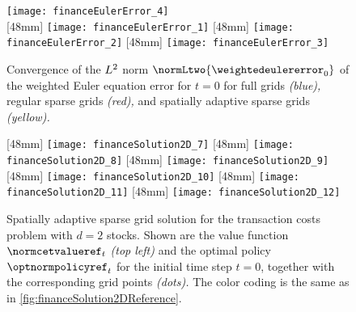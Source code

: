 
\begin{figure}
  \texttt{[image: financeEulerError\_4]}%
  \\[2mm]%
  [48mm]{%
    \texttt{[image: financeEulerError\_1]}%
  }%
  \hfill%
  [48mm]{%
    \texttt{[image: financeEulerError\_2]}%
  }%
  \hfill%
  [48mm]{%
    \texttt{[image: financeEulerError\_3]}%
  }%
  \caption[Convergence of the weighted Euler equation error]{%
    Convergence of the $L^2$ norm $\normLtwo{\weightedeulererror_0}$
    of the weighted Euler equation error for $t = 0$ for
    full grids \emph{\textcolor{C0}{(blue)},}
    regular sparse grids \emph{\textcolor{C1}{(red)},} and
    spatially adaptive sparse grids \emph{\textcolor{C2}{(yellow)}.}%
  }%
  \label{fig:financeEulerError}%
\end{figure}



\begin{figure}
  [48mm]{%
    \texttt{[image: financeSolution2D\_7]}%
  }%
  \hfill%
  [48mm]{%
    \texttt{[image: financeSolution2D\_8]}%
  }%
  \hfill%
  [48mm]{%
    \texttt{[image: financeSolution2D\_9]}%
  }%
  \\[2mm]%
  [48mm]{%
    \texttt{[image: financeSolution2D\_10]}%
  }%
  \hfill%
  [48mm]{%
    \texttt{[image: financeSolution2D\_11]}%
  }%
  \hfill%
  [48mm]{%
    \texttt{[image: financeSolution2D\_12]}%
  }%
  \caption[Sparse grid solution for the two-dimensional TCP]{%
    Spatially adaptive sparse grid solution for the transaction costs problem
    with $d = 2$ stocks.
    \vspace{-0.15em}%
    Shown are the value function $\normcetvalueref_t$ \emph{(top left)} and the
    optimal policy $\optnormpolicyref_t$ for the initial time step $t = 0$,
    together with the corresponding grid points \emph{(dots).}
    The color coding is the same as in
    \cref{fig:financeSolution2DReference}.%
  }%
  \label{fig:financeSolution2DSparseGrid}%
\end{figure}

\dummytext[2]{}

